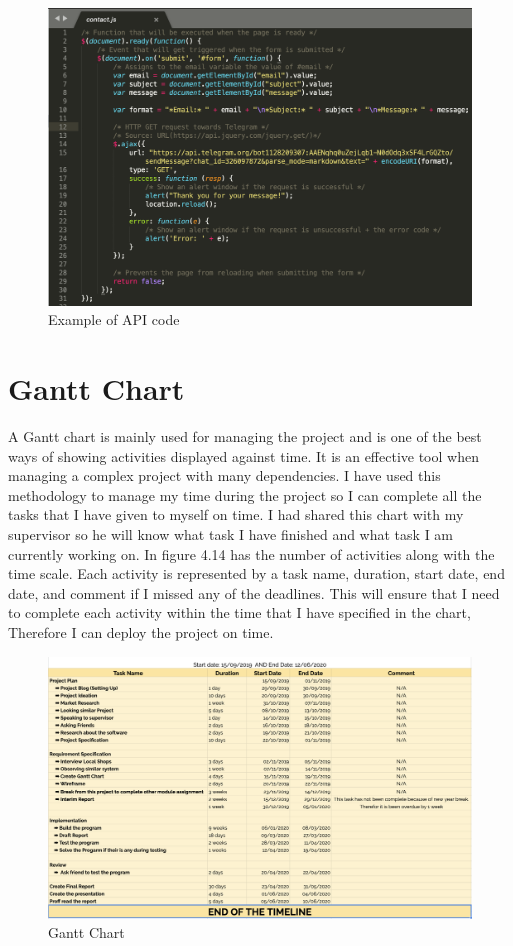\begin{figure}[H]
\centering
    \includegraphics[scale=0.41]
    {implement_image/javascript.png}
    \caption{Example of API code}
    \label{fig:Example of API code}
\end{figure}

\section{Gantt Chart}
A Gantt chart is mainly used for managing the project and is one of the best ways of showing activities displayed against time. It is an effective tool when managing a complex project with many dependencies. I have used this methodology to manage my time during the project so I can complete all the tasks that I have given to myself on time.  I had shared this chart with my supervisor so he will know what task I have finished and what task I am currently working on. In figure 4.14 has the number of activities along with the time scale. Each activity is represented by a task name, duration, start date, end date, and comment if I missed any of the deadlines. This will ensure that I need to complete each activity within the time that I have specified in the chart, Therefore I can deploy the project on time.

\begin{figure}[H]
\centering
    \includegraphics[scale=0.37]
    {ganttchart.png}
    \caption{Gantt Chart}
    \label{fig:Gantt Chart}
\end{figure}


